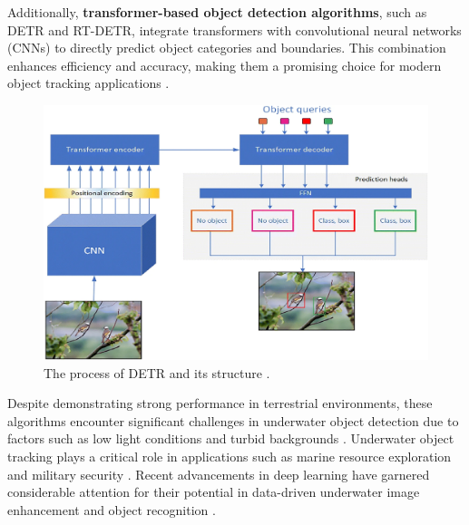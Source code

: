 Additionally, \textbf{transformer-based object detection algorithms}, such as DETR and RT-DETR, integrate transformers with convolutional neural networks (CNNs) to directly predict object categories and boundaries. This combination enhances efficiency and accuracy, making them a promising choice for modern object tracking applications \cite{zhou2024real}.
\begin{figure}[ht]
    \centering
    \includegraphics[width=1\linewidth]{images/The process of DETR and its structure.png}
    \caption{The process of DETR and its structure \cite{arkin2023survey}.}
\end{figure}

Despite demonstrating strong performance in terrestrial environments, these algorithms encounter significant challenges in underwater object detection due to factors such as low light conditions and turbid backgrounds \cite{qiu2024boundary, zhou2024real, mathias2022occlusion}. Underwater object tracking plays a critical role in applications such as marine resource exploration and military security \cite{qiu2024boundary}. Recent advancements in deep learning have garnered considerable attention for their potential in data-driven underwater image enhancement and object recognition \cite{yang2024lu2net}.

